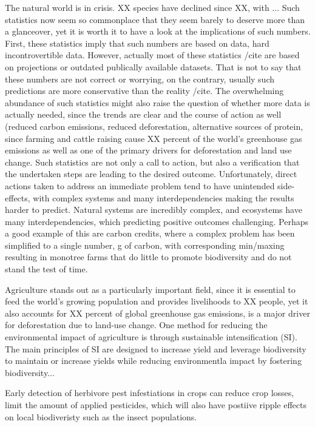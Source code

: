 The natural world is in crisis. XX species have declined since XX, with ... Such statistics now seem so commonplace that they seem barely to deserve more than a glanceover, yet it is worth it to have a look at the implications of such numbers. First, these statistics imply that such numbers are based on data, hard incontrovertible data. However, actually most of these statistics /cite are based on projections or outdated publically available datasets. That is not to say that these numbers are not correct or worrying, on the contrary, usually such predictions are more conservative than the reality /cite. The overwhelming abundance of such statistics might also raise the question of whether more data is actually needed, since the trends are clear and the course of action as well (reduced carbon emissions, reduced deforestation, alternative sources of protein, since farming and cattle raising cause XX percent of the world's greenhouse gas emissions as well as one of the primary drivers for deforestation and land use change. Such statistics are not only a call to action, but also a verification that the undertaken steps are leading to the desired outcome. Unfortunately, direct actions taken to address an immediate problem tend to have unintended side-effects, with complex systems and many interdependencies making the results harder to predict.  %
Natural systems are incredibly complex, and ecosystems have many interdependencies, which predicting positive outcomes challenging. Perhaps a good example of this are carbon credits, where a complex problem has been simplified to a single number, g of carbon, with corresponding min/maxing resulting in monotree farms that do little to promote biodiversity and do not stand the test of time. 

Agriculture stands out as a particularly important field, since it is essential to feed the world's growing  population and provides livelihoods to XX people, yet it also accounts for XX percent of global greenhouse gas emissions, is a major driver for deforestation due to land-use change. One method for reducing the environmental impact of agriculture is through sustainable intensification (SI). The main principles of SI are designed to increase yield and leverage biodiversity to maintain or increase yields while reducing environmentla impact by fostering biodiversity...

Early detection of herbivore pest infestiations in crops can reduce crop losses, limit the amount of applied pesticides, which will also have postiive ripple effects on local biodiveristy such as the insect populations. 

